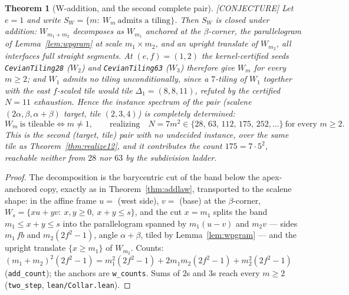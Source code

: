 \documentclass[11pt,reqno]{amsart}
\theoremstyle{plain}
\newtheorem{theorem}{Theorem}
\theoremstyle{definition}
\newcommand{\lab}[1]{\hfill\textnormal{\footnotesize\textsc{[#1]}}}
\begin{document}
\begin{theorem}[W-addition, and the second complete pair]\label{thm:wfamily}\lab{CONJECTURE}
Let $e=1$ and write $S_W=\{m:\ W_m\ \text{admits a tiling}\}$. Then $S_W$ is closed under
addition: $W_{m_1+m_2}$ decomposes as $W_{m_1}$ anchored at the $\beta$-corner, the parallelogram
of Lemma~\ref{lem:wpgram} at scale $m_1\times m_2$, and an upright translate of $W_{m_2}$, all
interfaces full straight segments. At $(e,f)=(1,2)$ the kernel-certified seeds
\textup{\texttt{CevianTiling28}} ($W_2$) and \textup{\texttt{CevianTiling63}} ($W_3$) therefore
give $W_m$ for every $m\ge2$; and $W_1$ admits no tiling unconditionally, since a $7$-tiling of
$W_1$ together with the east $f$-scaled tile would tile $\Delta_1=(8,8,11)$, refuted by the
certified $N=11$ exhaustion. Hence the instance spectrum of the pair
(scalene $(2\alpha,\beta,\alpha{+}\beta)$ target, tile $(2,3,4)$) is completely determined:
\[
W_m\ \text{is tileable}\iff m\neq1,\qquad\text{realizing}\quad N=7m^2\in\{28,\,63,\,112,\,175,\,252,\dots\}\ \text{for every }m\ge2 .
\]
This is the second (target, tile) pair with no undecided instance, over the same tile as
Theorem~\ref{thm:realize12}, and it contributes the count $175=7\cdot5^2$, reachable neither from
$28$ nor $63$ by the subdivision ladder.
\end{theorem}

\begin{proof}
The decomposition is the barycentric cut of the band below the apex-anchored copy, exactly as in
Theorem~\ref{thm:addlaw}, transported to the scalene shape: in the affine frame $u=$ (west side),
$v=$ (base) at the $\beta$-corner, $W_s=\{xu+yv:\ x,y\ge0,\ x+y\le s\}$, and the cut $x=m_1$
splits the band $m_1\le x+y\le s$ into the parallelogram spanned by $m_1(u-v)$ and $m_2v$ ---
sides $m_1\,fb$ and $m_2(2f^2-1)$, angle $\alpha+\beta$, tiled by Lemma~\ref{lem:wpgram} --- and
the upright translate $\{x\ge m_1\}$ of $W_{m_2}$. Counts:
$(m_1+m_2)^2(2f^2-1)=m_1^2(2f^2-1)+2m_1m_2(2f^2-1)+m_2^2(2f^2-1)$ (\texttt{add\_count}); the
anchors are \texttt{w\_counts}. Sums of $2$s and $3$s reach every $m\ge2$
(\texttt{two\_step}, \textup{\texttt{lean/Collar.lean}}).
\end{proof}
\end{document}
